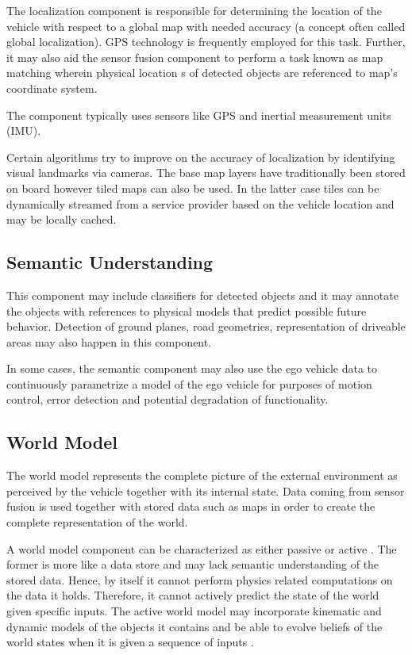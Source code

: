 The localization component is responsible for determining the location of the vehicle with respect to a global map with needed accuracy (a concept often called global localization).
GPS technology is frequently employed for this task.
Further, it may also aid the sensor fusion component to perform a task known as map matching wherein physical location s of detected objects are referenced to map’s coordinate system. 

The component typically uses sensors like GPS and inertial measurement units (IMU).

Certain algorithms try to improve on the accuracy of localization by identifying visual landmarks via cameras. The base map layers have traditionally been stored on board however tiled maps can also be used. In the latter case tiles can be dynamically streamed from a service provider based on the vehicle location and may be locally cached.

\subsection{Semantic Understanding}
This component may include classifiers for detected objects and it may annotate the objects with references to physical models that predict possible future behavior. Detection of ground planes, road geometries, representation of driveable areas may also happen in this component.

In some cases, the semantic component may also use the ego vehicle data to continuously parametrize a model of the ego vehicle for purposes of motion control, error detection and potential degradation of functionality.

\subsection{World Model}
The world model represents the complete picture of the external environment as perceived by the vehicle together with 
its internal state. Data coming from sensor fusion is used together with stored data such as maps in order to create
the complete representation of the world. 


A world model component can be characterized as either passive or active \cite{Bahere}. 
The former is more like a data store and may lack semantic understanding of the stored data. 
Hence, by itself it cannot perform physics related computations on the data it holds. 
Therefore, it cannot actively predict the state of the world given specific inputs. 
The active world model may incorporate kinematic and dynamic models of the objects it contains 
and be able to evolve beliefs of the world states when it is given a sequence of inputs \cite{Bahere}.

